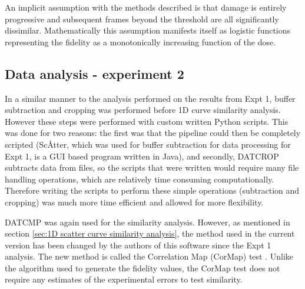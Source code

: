 An implicit assumption with the methods described is that damage is entirely progressive and subsequent frames beyond the threshold are all significantly dissimilar.
Mathematically this assumption manifests itself as logistic functions representing the fidelity as a monotonically increasing function of the dose.

\subsection{Data analysis - experiment 2}
\label{sub:Data analysis - experiment 2}
In a similar manner to the analysis performed on the results from Expt 1, buffer subtraction and cropping was performed before 1D curve similarity analysis.
However these steps were performed with custom written Python scripts.
This was done for two reasons:
the first was that the pipeline could then be completely scripted (Sc\AA tter, which was used for buffer subtraction for data processing for Expt 1, is a GUI based program written in Java),
and secondly, DATCROP subtracts data from files, so the scripts that were written would require many file handling operations, which are relatively time consuming computationally.
Therefore writing the scripts to perform these simple operations (subtraction and cropping) was much more time efficient and allowed for more flexibility.

DATCMP was again used for the similarity analysis.
However, as mentioned in section \ref{sec:1D scatter curve similarity analysis}, the method used in the current version has been changed by the authors of this software since the Expt 1 analysis.
The new method is called the Correlation Map (CorMap) test \cite{franke2015correlation}.
Unlike the algorithm used to generate the fidelity values, the CorMap test does not require any estimates of the experimental errors to test similarity.

